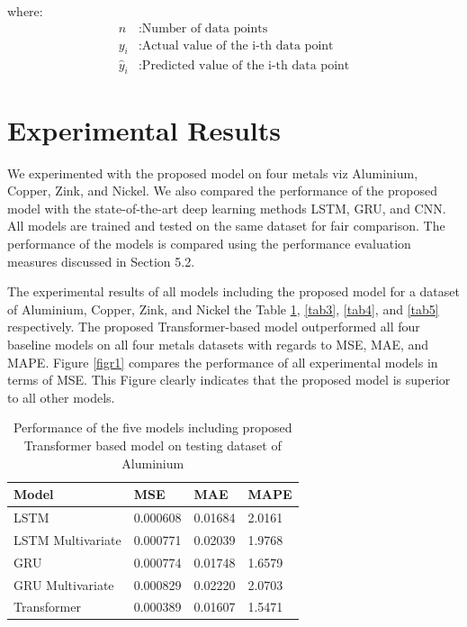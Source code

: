 \documentclass{ws-ijait}
\begin{document}
where:
\begin{align*}
	n & : \text{Number of data points} \\
	y_i & : \text{Actual value of the i-th data point} \\
	\hat{y}_i & : \text{Predicted value of the i-th data point}
\end{align*}

\section{Experimental Results}
We experimented with the proposed model on four metals viz Aluminium, Copper, Zink, and Nickel. We also compared the performance of the proposed model with the state-of-the-art deep learning methods LSTM, GRU, and CNN. All models are trained and tested on the same dataset for fair comparison. The performance of the models is compared using the performance evaluation measures discussed in Section 5.2.
\par The experimental results of all models including the proposed model for a dataset of Aluminium, Copper, Zink, and Nickel the Table \ref{tab2},  \ref{tab3},  \ref{tab4}, and  \ref{tab5} respectively. The proposed Transformer-based model outperformed all four baseline models on all four metals datasets with regards to MSE, MAE, and MAPE. Figure \ref{figr1} compares the performance of all experimental models in terms of MSE. This Figure clearly indicates that the proposed model is superior to all other models. 

\begin{table}[!htbp]
	\begin{center}
		\begin{tabular}{ p{3cm}|p{3cm}|p{3cm}|p{3cm} } \hline
			
			\textbf{Model}& \textbf{MSE}&\textbf{MAE}&\textbf{MAPE}\\ \hline 
			LSTM&0.000608 &0.01684& 2.0161\\ \hline 
			LSTM Multivariate&0.000771 &0.02039&1.9768\\ \hline
			GRU&0.000774 &0.01748&1.6579\\ \hline
			GRU Multivariate&0.000829 &0.02220&2.0703\\ \hline
			Transformer&0.000389 &0.01607 &1.5471\\ \hline
		\end{tabular}
		\caption{Performance of the five models including proposed Transformer based model on testing dataset of Aluminium} \label{tab2}
	\end{center}
\end{table}
\end{document}
